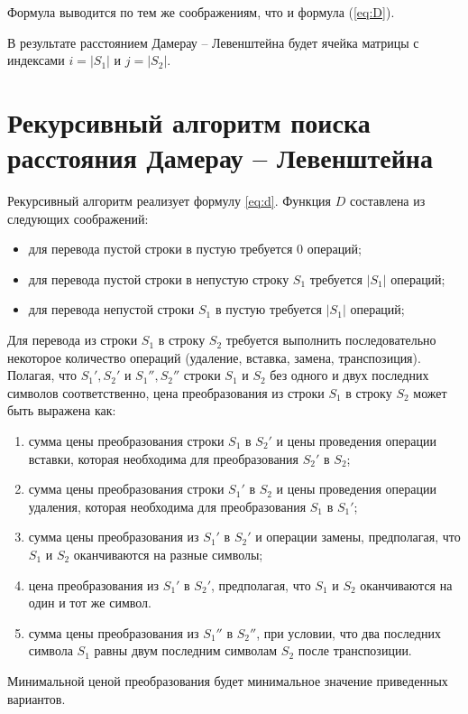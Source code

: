 Формула выводится по тем же соображениям, что и формула (\ref{eq:D}).

В результате расстоянием Дамерау -- Левенштейна будет ячейка матрицы с индексами $i = |S_1|$ и $j = |S_2|$.

\section{Рекурсивный алгоритм поиска расстояния Дамерау -- Левенштейна}

Рекурсивный алгоритм реализует формулу \ref{eq:d}.
Функция $D$ составлена из следующих соображений:
\begin{itemize}
	\item для перевода пустой строки в пустую требуется 0 операций;
	\item для перевода пустой строки в непустую строку $S_1$ требуется $|S_1|$ операций;
	\item для перевода непустой строки $S_1$ в пустую требуется $|S_1|$ операций;
\end{itemize}
Для перевода из строки $S_1$ в строку $S_2$ требуется выполнить последовательно некоторое количество операций (удаление, вставка, замена, транспозиция). Полагая, что $S_1', S_2'$ и $S_1'', S_2''$ строки $S_1$ и $S_2$ без одного и двух последних символов соответственно, цена преобразования из строки $S_1$ в строку $S_2$ может быть выражена как:
	\begin{enumerate}[label={\arabic*)}]
		\item сумма цены преобразования строки $S_1$ в $S_2'$  и цены проведения операции вставки, которая необходима для преобразования $S_2'$ в $S_2$;
		\item сумма цены преобразования строки $S_1'$ в $S_2$ и цены проведения операции удаления, которая необходима для преобразования $S_1$ в $S_1'$;
		\item сумма цены преобразования из $S_1'$ в $S_2'$ и операции замены, предполагая, что $S_1$ и $S_2$ оканчиваются на разные символы;
		\item цена преобразования из $S_1'$ в $S_2'$, предполагая, что $S_1$ и $S_2$ оканчиваются на один и тот же символ.
		\item сумма цены преобразования из $S_1''$ в $S_2''$, при условии, что два последних символа $S_1$ равны двум последним символам $S_2$ после транспозиции.
	\end{enumerate}
Минимальной ценой преобразования будет минимальное значение приведенных вариантов.

